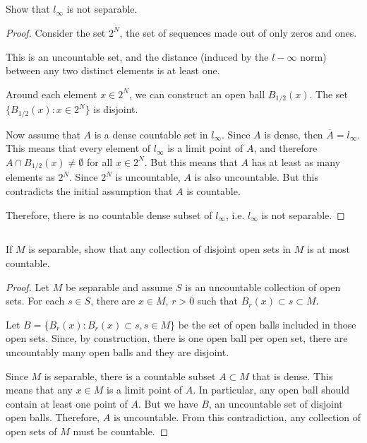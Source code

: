 \subsection{} Show that $l_\infty$ is not separable.

\begin{proof}

Consider the set $2^N$, the set of sequences made out of only zeros and ones.

This is an uncountable set, and the distance (induced by the $l-\infty$ norm) between any two distinct elements is at least one.

Around each element $x \in 2^N$, we can construct an open ball $B_{1/2}(x)$. The set $\{B_{1/2}(x) : x \in 2^N\}$ is disjoint.

Now assume that $A$ is a dense countable set in $l_\infty$. Since $A$ is dense, then $\overline{A} = l_\infty$. This means that every element of $l_\infty$ is a limit point of $A$, and therefore $A \cap B_{1/2}(x) \neq \emptyset$ for all $x \in 2^N$. But this means that $A$ has at least as many elements as $2^N$. Since $2^N$ is uncountable, $A$ is also uncountable. But this contradicts the initial assumption that $A$ is countable.

Therefore, there is no countable dense subset of $l_\infty$, i.e. $l_\infty$ is not separable.

\end{proof}

\subsection{} If $M$ is separable, show that any collection of disjoint open sets  in  $M$  is at most countable. 

\begin{proof}
Let $M$ be separable and assume $S$ is an uncountable collection of open sets. For each $s \in S$, there are $x \in M$, $r > 0$ such that $B_r(x) \subset s \subset M$.

Let $B = \{B_r(x) : B_r(x) \subset s, s \in M\}$ be the set of open balls included in those open sets. Since, by construction, there is one open ball per open set, there are uncountably many open balls and they are disjoint.

Since $M$ is separable, there is a countable subset $A \subset M$ that is dense. This means that any $x \in M$ is a limit point of $A$. In particular, any open ball should contain at least one point of $A$. But we have $B$, an uncountable set of disjoint open balls. Therefore, $A$ is uncountable. From this contradiction, any collection of open sets of $M$ must be countable.
\end{proof}

